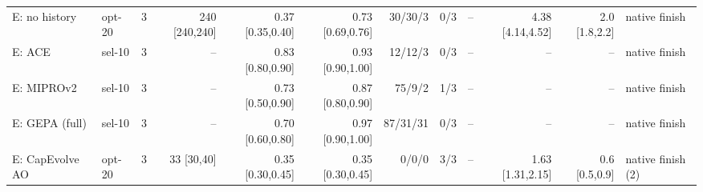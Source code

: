 \begin{table}[t]
{\begin{tabular}{@{}llrrrrrrrrrl@{}}
E: no history & opt-20 & 3 & 240 {\tiny[240,240]} & 0.37 {\tiny[0.35,0.40]} & 0.73 {\tiny[0.69,0.76]} & 30/30/3 & 0/3 & -- & 4.38 {\tiny[4.14,4.52]} & 2.0 {\tiny[1.8,2.2]} & native finish \\
E: ACE & sel-10 & 3 & -- & 0.83 {\tiny[0.80,0.90]} & 0.93 {\tiny[0.90,1.00]} & 12/12/3 & 0/3 & -- & -- & -- & native finish \\
E: MIPROv2 & sel-10 & 3 & -- & 0.73 {\tiny[0.50,0.90]} & 0.87 {\tiny[0.80,0.90]} & 75/9/2 & 1/3 & -- & -- & -- & native finish \\
E: GEPA (full) & sel-10 & 3 & -- & 0.70 {\tiny[0.60,0.80]} & 0.97 {\tiny[0.90,1.00]} & 87/31/31 & 0/3 & -- & -- & -- & native finish \\
E: CapEvolve AO & opt-20 & 3 & 33 {\tiny[30,40]} & 0.35 {\tiny[0.30,0.45]} & 0.35 {\tiny[0.30,0.45]} & 0/0/0 & 3/3 & -- & 1.63 {\tiny[1.31,2.15]} & 0.6 {\tiny[0.5,0.9]} & native finish (2) \\
\bottomrule
\end{tabular}}
\end{table}
